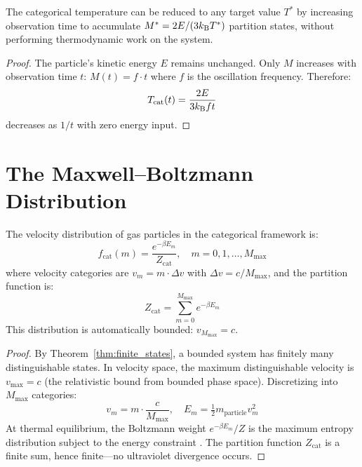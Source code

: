 \begin{corollary}
\label{cor:zero_work}
The categorical temperature can be reduced to any target value $T^*$ by increasing observation time to accumulate $M^* = 2E/(3k_{\mathrm{B}} T^*)$ partition states, without performing thermodynamic work on the system.
\end{corollary}

\begin{proof}
The particle's kinetic energy $E$ remains unchanged. Only $M$ increases with observation time $t$: $M(t) = f \cdot t$ where $f$ is the oscillation frequency. Therefore:
\begin{equation}
    T_{\mathrm{cat}}(t) = \frac{2E}{3k_{\mathrm{B}} f t}
\end{equation}
decreases as $1/t$ with zero energy input.
\end{proof}

\section{The Maxwell--Boltzmann Distribution}
\label{sec:maxwell}

\begin{theorem}
\label{thm:maxwell}
The velocity distribution of gas particles in the categorical framework is:
\begin{equation}
    f_{\mathrm{cat}}(m) = \frac{e^{-\beta E_m}}{Z_{\mathrm{cat}}}, \quad m = 0, 1, \ldots, M_{\max}
\end{equation}
where velocity categories are $v_m = m \cdot \Delta v$ with $\Delta v = c/M_{\max}$, and the partition function is:
\begin{equation}
    Z_{\mathrm{cat}} = \sum_{m=0}^{M_{\max}} e^{-\beta E_m}
\end{equation}
This distribution is automatically bounded: $v_{M_{\max}} = c$.
\end{theorem}

\begin{proof}
By Theorem~\ref{thm:finite_states}, a bounded system has finitely many distinguishable states. In velocity space, the maximum distinguishable velocity is $v_{\max} = c$ (the relativistic bound from bounded phase space). Discretizing into $M_{\max}$ categories:
\begin{equation}
    v_m = m \cdot \frac{c}{M_{\max}}, \quad E_m = \tfrac{1}{2}m_{\mathrm{particle}} v_m^2
\end{equation}
At thermal equilibrium, the Boltzmann weight $e^{-\beta E_m}/Z$ is the maximum entropy distribution subject to the energy constraint \cite{jaynes1957}. The partition function $Z_{\mathrm{cat}}$ is a finite sum, hence finite---no ultraviolet divergence occurs.
\end{proof}

